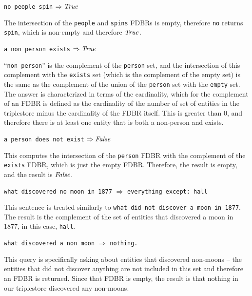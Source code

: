 \documentclass[../main.tex]{subfiles}
\begin{document}
\begin{refsection}
\examplespacing

\texttt{no people spin} $\Rightarrow \operatorname{\mathit{True}}$

\examplespacing

\noindent The intersection of the \texttt{people} and \texttt{spins} FDBRs is empty, therefore \texttt{no} returns \texttt{spin}, which is non-empty and therefore $\operatorname{\mathit{True}}$.

\texttt{a non person exists} $\Rightarrow \operatorname{\mathit{True}}$

\examplespacing

\noindent ``\texttt{non person}'' is the complement of the \texttt{person} set, and the intersection of this complement with the \texttt{exists} set (which is the complement of the empty set) is the same as the complement of the union of the \texttt{person} set with the \texttt{empty} set.  The answer is characterized in terms of the cardinality, which for the complement of an FDBR is defined as the cardinality of the number of set of entities in the triplestore minus the cardinality of the FDBR itself.  This is greater than 0, and therefore there is at least one entity that is both a non-person and exists.

\examplespacing

\texttt{a person does not exist} $\Rightarrow \operatorname{\mathit{False}}$

\examplespacing

\noindent This computes the intersection of the \texttt{person} FDBR with the complement of the \texttt{exists} FDBR, which is just the empty FDBR.  Therefore, the result is empty, and the result is $\operatorname{\mathit{False}}$.

\examplespacing

\texttt{what discovered no moon in 1877} $\Rightarrow$ \texttt{everything except: hall}

\examplespacing

\noindent This sentence is treated similarly to \texttt{what did not discover a moon in 1877}.  The result is the complement of the set of entities that discovered a moon in 1877, in this case, \texttt{hall}.

\examplespacing

\texttt{what discovered a non moon} $\Rightarrow$ \texttt{nothing.}

\examplespacing

\noindent This query is specifically asking about entities that discovered non-moons -- the entities that did not discover anything are not included in this set and therefore an FDBR is returned.  Since that FDBR is empty, the result is that nothing in our triplestore discovered any non-moons.


\end{refsection}
\end{document}
